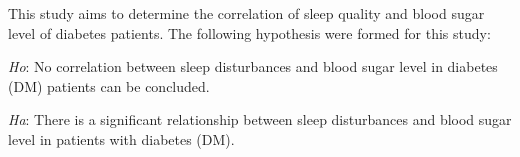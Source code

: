 
This study aims to determine the correlation of sleep quality and blood sugar
level of diabetes patients. The following hypothesis were formed for this study:
\vspace{0.75em}

\noindent
\textit{Ho}: No correlation between sleep disturbances and blood sugar level in diabetes (DM) patients can be concluded.

\noindent
\textit{Ha}: There is a significant relationship between sleep disturbances and
blood sugar level in patients with diabetes (DM).
